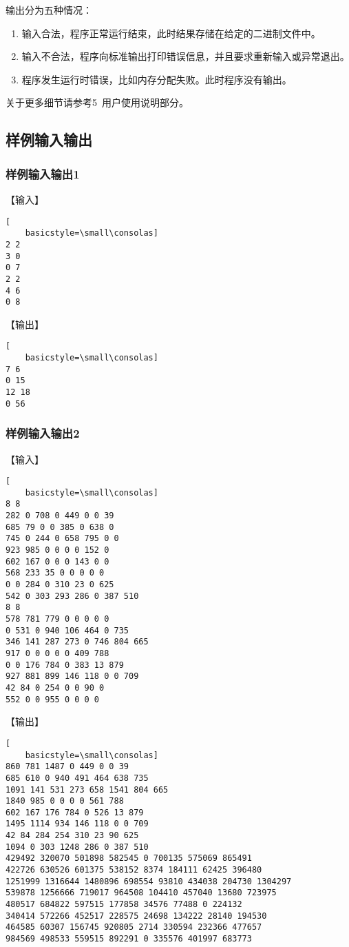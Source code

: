 \documentclass{article}
\begin{document}
输出分为五种情况：

\begin{enumerate}
    \item 输入合法，程序正常运行结束，此时结果存储在给定的二进制文件中。
    \item 输入不合法，程序向标准输出打印错误信息，并且要求重新输入或异常退出。
    \item 程序发生运行时错误，比如内存分配失败。此时程序没有输出。
\end{enumerate}

关于更多细节请参考5\ 用户使用说明部分。

\subsection{样例输入输出}

\subsubsection{样例输入输出1}

【输入】

\begin{lstlisting}[
    basicstyle=\small\consolas]
2 2
3 0
0 7
2 2
4 6
0 8
\end{lstlisting}

【输出】

\begin{lstlisting}[
    basicstyle=\small\consolas]
7 6 
0 15 
12 18 
0 56 
\end{lstlisting}

\subsubsection{样例输入输出2}

【输入】

\begin{lstlisting}[
    basicstyle=\small\consolas]
8 8
282 0 708 0 449 0 0 39
685 79 0 0 385 0 638 0
745 0 244 0 658 795 0 0
923 985 0 0 0 0 152 0
602 167 0 0 0 143 0 0
568 233 35 0 0 0 0 0
0 0 284 0 310 23 0 625
542 0 303 293 286 0 387 510
8 8
578 781 779 0 0 0 0 0
0 531 0 940 106 464 0 735
346 141 287 273 0 746 804 665
917 0 0 0 0 0 409 788
0 0 176 784 0 383 13 879
927 881 899 146 118 0 0 709
42 84 0 254 0 0 90 0
552 0 0 955 0 0 0 0
\end{lstlisting}

【输出】

\begin{lstlisting}[
    basicstyle=\small\consolas]
860 781 1487 0 449 0 0 39 
685 610 0 940 491 464 638 735 
1091 141 531 273 658 1541 804 665 
1840 985 0 0 0 0 561 788 
602 167 176 784 0 526 13 879 
1495 1114 934 146 118 0 0 709 
42 84 284 254 310 23 90 625 
1094 0 303 1248 286 0 387 510 
429492 320070 501898 582545 0 700135 575069 865491 
422726 630526 601375 538152 8374 184111 62425 396480 
1251999 1316644 1480896 698554 93810 434038 204730 1304297 
539878 1256666 719017 964508 104410 457040 13680 723975 
480517 684822 597515 177858 34576 77488 0 224132 
340414 572266 452517 228575 24698 134222 28140 194530 
464585 60307 156745 920805 2714 330594 232366 477657 
984569 498533 559515 892291 0 335576 401997 683773
\end{lstlisting}
\end{document}

